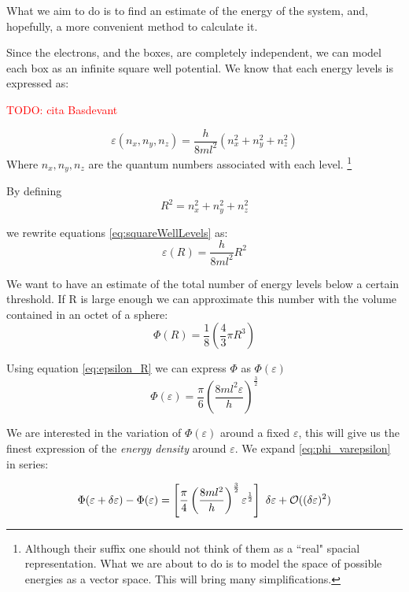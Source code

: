\documentclass[a4paper,12pt]{article}
\newcommand\mynotes[1]{\begin{flushright}

\textcolor{red}{TODO: #1}\end{flushright}}
\begin{document}
What we aim to do is to find an estimate of the energy of the system, and, hopefully, a more convenient method to calculate it.

Since the electrons, and the boxes, are completely independent, we can model each box as an infinite square well potential.
We know that each energy levels is expressed as:
\mynotes{cita Basdevant} 

\begin{equation}\label{eq:squareWellLevels}
	\varepsilon(n_{x},n_{y},n_{z}) = \frac{h}{8ml^{2}} (n_{x}^2+n_{y}^2+n_{z}^2)
\end{equation}
Where $n_{x},n_{y},n_{z}$ are the quantum numbers associated with each level.
\footnote{Although their suffix one should not think of them as a ``real" spacial representation. What we are about to do is to model the space of possible energies as a vector space. This will bring many simplifications.}

By defining 
\begin{equation}
	R^2 = n_{x}^2+n_{y}^2+n_{z}^2
\end{equation}

we rewrite equations \eqref{eq:squareWellLevels} as:
\begin{equation}\label{eq:epsilon_R}
	\varepsilon(R) = \frac{h}{8ml^{2}} R^2
\end{equation}

We want to have an estimate of the total number of energy levels below a certain threshold. 
If R is large enough we can approximate this number with the volume contained in an octet of a sphere:
\begin{equation}
	\Phi(R) = \frac{1}{8} \left( \frac{4}{3} \pi R^{3} \right)
\end{equation}

Using equation \eqref{eq:epsilon_R} we can express $\Phi$ as $\Phi(\varepsilon)$ 
\begin{equation}\label{eq:phi_varepsilon}
	\Phi(\varepsilon) = \frac{\pi}{6} \left( \frac{8 m l^2 \varepsilon}{h} \right)^{\frac{3}{2	}}
\end{equation}

We are interested in the variation of $\Phi(\varepsilon)$ around a fixed $\varepsilon$, this will give us the finest expression of the \textit{energy density} around $\varepsilon$. 
We expand \eqref{eq:phi_varepsilon} in series:

\begin{equation}
	\Phi(\varepsilon + \var{\varepsilon}) - \Phi(\varepsilon) = \left[ \frac{\pi}{4} \left( \frac{8 m l^2}{h} \right)^{\frac{3}{2}} \varepsilon^{\frac{1}{2}}  \right] ~ \var{\varepsilon} + \mathcal{O}((\var{\varepsilon})^2)
\end{equation}
\end{document}
